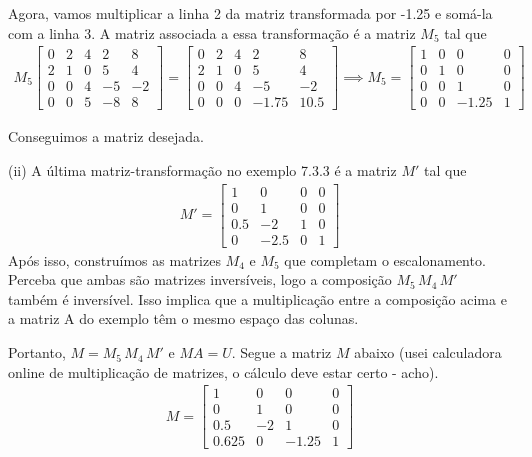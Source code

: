 \documentclass[11pt,reqno,a4paper]{amsart}
\begin{document}
Agora, vamos multiplicar a linha 2 da matriz transformada por -1.25 e somá-la com a linha 3.
A matriz associada a essa transformação é a matriz $M_5$ tal que
\begin{align*}
	M_5
	\begin{bmatrix}
		0 & 2 & 4 & 2 & 8\\
		2 & 1 & 0 & 5 & 4\\
		0 & 0 & 4 & -5 & -2\\
		0 & 0 & 5 & -8 & 8
	\end{bmatrix}
	= 
	\begin{bmatrix}
		0 & 2 & 4 & 2 & 8\\
		2 & 1 & 0 & 5 & 4\\
		0 & 0 & 4 & -5 & -2\\
		0 & 0 & 0 & -1.75 & 10.5
	\end{bmatrix}
	\implies
	M_5 = 
	\begin{bmatrix}
		1 & 0 & 0 & 0\\
		0 & 1 & 0 & 0\\
		0 & 0 & 1 & 0\\
		0  & 0 & -1.25 & 1
	\end{bmatrix}
\end{align*}

Conseguimos a matriz desejada.

(ii) A última matriz-transformação no exemplo 7.3.3 é a matriz $M'$ tal que
\begin{align*}
	M' =
	\begin{bmatrix}
		1 & 0 & 0 & 0\\
		0 & 1 & 0 & 0\\
		0.5 & -2 & 1 & 0\\
		0  & -2.5 & 0 & 1
	\end{bmatrix}
\end{align*}
Após isso, construímos as matrizes $M_4$ e $M_5$ que completam o escalonamento.
Perceba que ambas são matrizes inversíveis, logo a composição $M_5 \, M_4 \, M'$ também é inversível.
Isso implica que a multiplicação entre a composição acima e a matriz A do exemplo têm o mesmo espaço das colunas.

Portanto, $M = M_5 \, M_4 \, M'$ e $M A = U$. Segue a matriz $M$ abaixo (usei calculadora online de multiplicação de matrizes, o cálculo deve estar certo - acho).
\begin{align*}
	M = 
	\begin{bmatrix}
		1 & 0 & 0 & 0\\
		0 & 1 & 0 & 0\\
		0.5 & -2 & 1 & 0\\
		0.625 & 0 & -1.25 & 1
	\end{bmatrix}
\end{align*}
\end{document}
